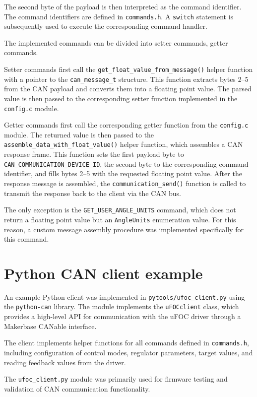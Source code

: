 The second byte of the payload is then interpreted as the command identifier.
The command identifiers are defined in \texttt{commands.h}.
A \texttt{switch} statement is subsequently used to execute the corresponding command handler.

The implemented commands can be divided into setter commands, getter commands.

Setter commands first call the \texttt{get\_float\_value\_from\_message()} helper function with a pointer to the \texttt{can\_message\_t} structure.
This function extracts bytes 2--5 from the CAN payload and converts them into a floating point value.
The parsed value is then passed to the corresponding setter function implemented in the \texttt{config.c} module.

Getter commands first call the corresponding getter function from the \texttt{config.c} module.
The returned value is then passed to the \texttt{assemble\_data\_with\_float\_value()} helper function, which assembles a CAN response frame.
This function sets the first payload byte to \texttt{CAN\_COMMUNICATION\_DEVICE\_ID}, the second byte to the corresponding command identifier, 
and fills bytes 2--5 with the requested floating point value. 
After the response message is assembled, the \texttt{communication\_send()} function is called to transmit the response back to the client via the CAN bus.

The only exception is the \texttt{GET\_USER\_ANGLE\_UNITS} command, which does not return a floating point value but an \texttt{AngleUnits} enumeration value.
For this reason, a custom message assembly procedure was implemented specifically for this command.

\section{Python CAN client example}
An example Python client was implemented in \texttt{pytools/ufoc\_client.py} using the \texttt{python-can} library. \cite{pycan}
The module implements the \texttt{uFOCclient} class, which provides a high-level API for communication with the uFOC driver through a Makerbase CANable interface.

The client implements helper functions for all commands defined in \texttt{commands.h}, including configuration of control modes, 
regulator parameters, target values, and reading feedback values from the driver.

The \texttt{ufoc\_client.py} module was primarily used for firmware testing and validation of CAN communication functionality.





